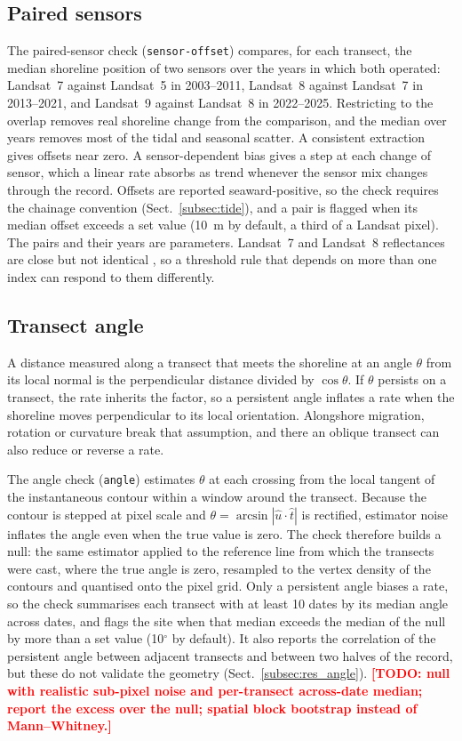 \documentclass[authoryear,preprint,review,12pt]{elsarticle}
\newcommand{\todo}[1]{\textcolor{red}{\textbf{[TODO: #1]}}}
\begin{document}
\subsection{Paired sensors}\label{subsec:sensorcheck}
The paired-sensor check (\texttt{sensor-offset}) compares, for each transect, the median shoreline
position of two sensors over the years in which both operated: Landsat~7
against Landsat~5 in 2003--2011, Landsat~8 against Landsat~7 in 2013--2021, and
Landsat~9 against Landsat~8 in 2022--2025. Restricting to the overlap removes
real shoreline change from the comparison, and the median over years removes
most of the tidal and seasonal scatter. A consistent extraction gives offsets
near zero. A sensor-dependent bias gives a step at each change of sensor,
which a linear rate absorbs as trend whenever the sensor mix changes through
the record. Offsets are reported seaward-positive, so the check requires the
chainage convention (Sect.~\ref{subsec:tide}), and a pair is flagged when its
median offset exceeds a set value (10~m by default, a third of a Landsat
pixel). The pairs and their years are parameters. Landsat~7 and Landsat~8 reflectances are close but not identical
\citep{roy2016continuity}, so a threshold rule that depends on more than one
index can respond to them differently.

\subsection{Transect angle}\label{subsec:anglecheck}
A distance measured along a transect that meets the shoreline at an angle
$\theta$ from its local normal is the perpendicular distance divided by
$\cos\theta$. If $\theta$ persists on a transect, the rate inherits the factor,
so a persistent angle inflates a rate when the shoreline moves perpendicular to
its local orientation. Alongshore migration, rotation or curvature break that
assumption, and there an oblique transect can also reduce or reverse a rate.

The angle check (\texttt{angle}) estimates $\theta$ at each crossing from the local tangent of
the instantaneous contour within a window around the transect. Because the
contour is stepped at pixel scale and $\theta=\arcsin|\hat u\cdot\hat t|$ is
rectified, estimator noise inflates the angle even when the true value is zero.
The check therefore builds a null: the same estimator applied to the reference
line from which the transects were cast, where the true angle is zero,
resampled to the vertex density of the contours and quantised onto the pixel
grid. Only a persistent angle biases a rate, so the check summarises each
transect with at least 10 dates by its median angle across dates, and flags the
site when that median exceeds the median of the null by more than a set value
(10$^\circ$ by default). It also reports the correlation of the persistent
angle between adjacent transects and between two halves of the record, but
these do not validate the geometry (Sect.~\ref{subsec:res_angle}).
\todo{null with realistic sub-pixel noise and per-transect across-date median;
report the excess over the null; spatial block bootstrap instead of
Mann--Whitney.}
\end{document}
